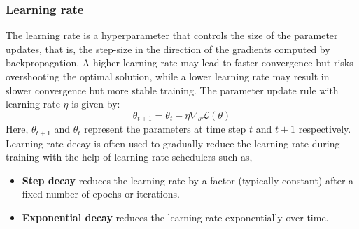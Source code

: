 \subsubsection{Learning rate}
The learning rate is a hyperparameter that controls the size of the parameter updates, that is, the step-size in the direction of the gradients computed by backpropagation. A higher learning rate may lead to faster convergence but risks overshooting the optimal solution, while a lower learning rate may result in slower convergence but more stable training. The parameter update rule with learning rate $\eta$ is given by:
\begin{equation}
    \theta_{t+1}=\theta_t-\eta \nabla_\theta \mathcal{L}(\theta)
    \end{equation}
Here, $\theta_{t+1}$ and $\theta_t$ represent the parameters at time step $t$ and $t+1$ respectively. Learning rate decay is often used to gradually reduce the learning rate during training with the help of learning rate schedulers such as,
\begin{itemize}
\item \textbf{Step decay} reduces the learning rate by a factor (typically constant) after a fixed number of epochs or iterations.
\item \textbf{Exponential decay} reduces the learning rate exponentially over time.
\end{itemize}
